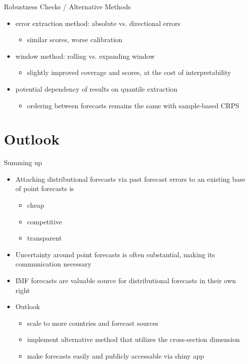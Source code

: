 \documentclass[en]{sdqbeamer}
\begin{document}
\begin{frame}{Robustness Checks / Alternative Methods}
\begin{itemize}
    \item error extraction method: absolute vs. directional errors
    \begin{itemize}
    \item similar scores, worse calibration \hyperlink{errorextraction}{}
    \end{itemize}
    \item window method: rolling vs. expanding window
    \begin{itemize}
    \item slightly improved coverage and scores, at the cost of interpretability \hyperlink{extractionmethod}{}
    \end{itemize}
    \item potential dependency of results on quantile extraction \\
    \begin{itemize}
        \item ordering between forecasts remains the same with sample-based CRPS \hyperlink{samplecrps}{}
    \end{itemize}
\end{itemize}
\end{frame}



\section{Outlook}

\begin{frame}{Summing up}
\begin{itemize}
\item Attaching distributional forecasts via past forecast errors to an existing base of point forecasts is
    \begin{itemize}
        \item cheap
        \item competitive
        \item transparent
    \end{itemize}
\item Uncertainty around point forecasts is often substantial, making its communication necessary
\item IMF forecasts are valuable source for distributional forecasts in their own right \bigskip \\
\item     Outlook
    \begin{itemize}
        \item scale to more countries and forecast sources
        \item implement alternative method that  utilizes the cross-section dimension%
        \item make forecasts easily and publicly accessable via shiny app
    \end{itemize}

\end{itemize}
\end{frame}
\end{document}
